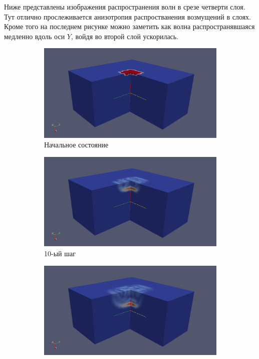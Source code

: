 	Ниже представлены изображения распространения волн в срезе четверти слоя.
	Тут отлично прослеживается анизотропия распростванения возмущений в слоях.
	Кроме того на последнем рисунке можно заметить как волна распространявшаяся медленно вдоль оси $Y$, войдя во второй слой ускорилась.
\begin{figure}[H]
\begin{subfigure}[b]{0.5\textwidth}
\centering
\includegraphics[width=1.0\textwidth]{png/two-layers/clip2_0.png}
\caption{Начальное состояние}
\end{subfigure}
\begin{subfigure}[b]{0.5\textwidth}
\centering
\includegraphics[width=1.0\textwidth]{png/two-layers/clip2_10.png}
\caption{10-ый шаг}
\end{subfigure}
\begin{subfigure}[b]{0.5\textwidth}
\centering
\includegraphics[width=1.0\textwidth]{png/two-layers/clip2_20.png}

\end{subfigure}
\end{figure}
